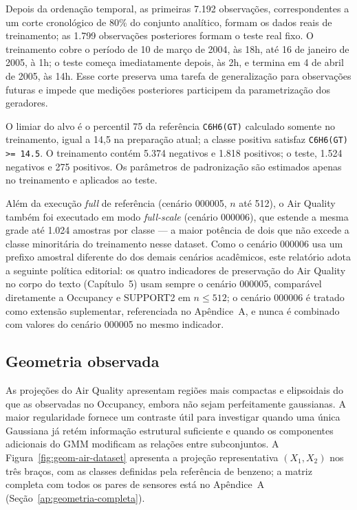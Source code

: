 Depois da ordenação temporal, as primeiras 7.192 observações, correspondentes a um corte cronológico de 80\% do conjunto analítico, formam os dados reais de treinamento; as 1.799 observações posteriores formam o teste real fixo. O treinamento cobre o período de 10 de março de 2004, às 18h, até 16 de janeiro de 2005, à 1h; o teste começa imediatamente depois, às 2h, e termina em 4 de abril de 2005, às 14h. Esse corte preserva uma tarefa de generalização para observações futuras e impede que medições posteriores participem da parametrização dos geradores.

O limiar do alvo é o percentil 75 da referência \texttt{C6H6(GT)} calculado somente no treinamento, igual a 14,5 na preparação atual; a classe positiva satisfaz \texttt{C6H6(GT) >= 14.5}. O treinamento contém 5.374 negativos e 1.818 positivos; o teste, 1.524 negativos e 275 positivos. Os parâmetros de padronização são estimados apenas no treinamento e aplicados ao teste.

Além da execução \textit{full} de referência (cenário 000005, $n$ até 512), o Air Quality também foi executado em modo \textit{full-scale} (cenário 000006), que estende a mesma grade até 1.024 amostras por classe --- a maior potência de dois que não excede a classe minoritária do treinamento nesse dataset. Como o cenário 000006 usa um prefixo amostral diferente do dos demais cenários acadêmicos, este relatório adota a seguinte política editorial: os quatro indicadores de preservação do Air Quality no corpo do texto (Capítulo~5) usam sempre o cenário 000005, comparável diretamente a Occupancy e SUPPORT2 em $n\leq512$; o cenário 000006 é tratado como extensão suplementar, referenciada no Apêndice~A, e nunca é combinado com valores do cenário 000005 no mesmo indicador.

\subsection{Geometria observada}

As projeções do Air Quality apresentam regiões mais compactas e elipsoidais do que as observadas no Occupancy, embora não sejam perfeitamente gaussianas. A maior regularidade fornece um contraste útil para investigar quando uma única Gaussiana já retém informação estrutural suficiente e quando os componentes adicionais do GMM modificam as relações entre subconjuntos. A Figura~\ref{fig:geom-air-dataset} apresenta a projeção representativa $(X_1,X_2)$ nos três braços, com as classes definidas pela referência de benzeno; a matriz completa com todos os pares de sensores está no Apêndice~A (Seção~\ref{ap:geometria-completa}).

